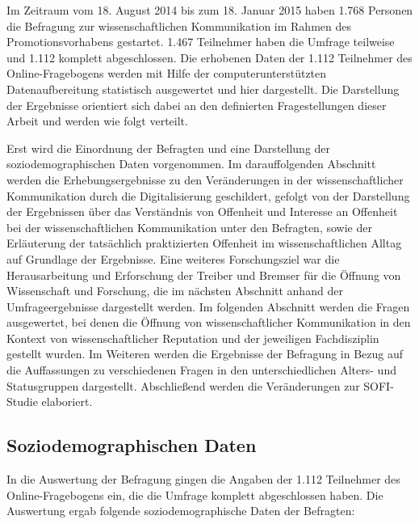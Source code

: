 Im Zeitraum vom 18. August 2014 bis zum 18. Januar 2015 haben 1.768 Personen die Befragung zur wissenschaftlichen Kommunikation im Rahmen des Promotionsvorhabens gestartet. 1.467 Teilnehmer haben die Umfrage teilweise und 1.112 komplett abgeschlossen. Die erhobenen Daten der 1.112 Teilnehmer des Online-Fragebogens werden mit Hilfe der computerunterstützten Datenaufbereitung statistisch ausgewertet und hier dargestellt. Die Darstellung der Ergebnisse orientiert sich dabei an den definierten Fragestellungen dieser Arbeit und werden wie folgt verteilt.

Erst wird die Einordnung der Befragten und eine Darstellung der soziodemographischen Daten vorgenommen. Im darauffolgenden Abschnitt werden die Erhebungsergebnisse zu den Veränderungen in der wissenschaftlicher Kommunikation durch die Digitalisierung geschildert, gefolgt von der Darstellung der Ergebnissen über das Verständnis von Offenheit und Interesse an Offenheit bei der wissenschaftlichen Kommunikation unter den Befragten, sowie der Erläuterung der tatsächlich praktizierten Offenheit im wissenschaftlichen Alltag auf Grundlage der Ergebnisse. Eine weiteres Forschungsziel war die Herausarbeitung und Erforschung der Treiber und Bremser für die Öffnung von Wissenschaft und Forschung, die im nächsten Abschnitt anhand der Umfrageergebnisse dargestellt werden. Im folgenden Abschnitt werden die Fragen ausgewertet, bei denen die Öffnung von wissenschaftlicher Kommunikation in den Kontext von wissenschaftlicher Reputation und der jeweiligen Fachdisziplin gestellt wurden. Im Weiteren werden die Ergebnisse der Befragung in Bezug auf die Auffassungen zu verschiedenen Fragen in den unterschiedlichen Alters- und Statusgruppen dargestellt. Abschließend werden die Veränderungen zur SOFI-Studie elaboriert.

\subsection{Soziodemographischen Daten}

In die Auswertung der Befragung gingen die Angaben der 1.112 Teilnehmer des Online-Fragebogens ein, die die Umfrage komplett abgeschlossen haben. Die Auswertung ergab folgende soziodemographische Daten der Befragten:

